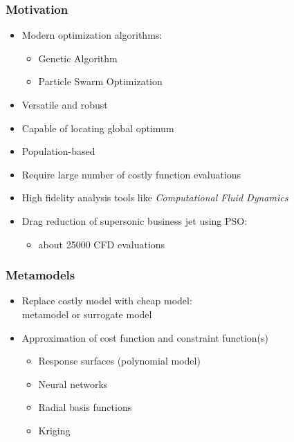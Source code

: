 \begin{frame}
  \frametitle{Motivation}

  \begin{itemize}

  \item Modern optimization algorithms: 
  \begin{itemize}
  \item Genetic Algorithm
  \item Particle Swarm Optimization
  \end{itemize}
  \item Versatile and robust
  \item Capable of locating global optimum
  \item Population-based
  \item Require large number of costly function evaluations
  \item High fidelity analysis tools like \em{Computational Fluid Dynamics}
  \item Drag reduction of supersonic business jet using PSO:
  \begin{itemize}
  \item about 25000 CFD evaluations
  \end{itemize}

  \end{itemize}

\end{frame}
\begin{frame}
  \frametitle{Metamodels}

  \begin{itemize}

  \item Replace costly model with cheap model:\\
  \color{red} metamodel \color{black} or \color{blue} surrogate model \color{black}

  \item Approximation of cost function and constraint function(s)

  \begin{itemize}
  \item Response surfaces (polynomial model)
  \item Neural networks
  \item Radial basis functions
  \item Kriging
  \end{itemize}

  \end{itemize}

\end{frame}
